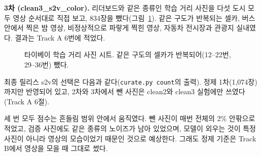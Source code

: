 \documentclass[11pt]{article}
\begin{document}
\textbf{3차 (clean3\_s2v\_color).} 리더보드와 같은 종류인 학습 거리 사진을 다섯 도시 모두 영상 순서대로 직접 보고, 834장을 뺐다(그림~\ref{fig:selfie}). 같은 구도가 반복되는 셀카, 버스 안에서 찍은 밤 영상, 비정상적으로 파랗게 찍힌 영상, 자동차 전시장과 관광지 실내였다. 결과는 Track A 6번에 적었다.

\begin{figure}[H]\centering
{}
\caption{타이베이 학습 거리 사진 시트. 같은 구도의 셀카가 반복되어(12--22번, 29--36번) 뺐다.}
\label{fig:selfie}
\end{figure}

최종 릴리스 s2v의 선택은 다음과 같다(\texttt{curate.py count}의 출력). 정제 1차(1,074장)까지만 반영되어 있고, 2차와 3차에서 뺀 사진은 clean2와 clean3 실험에만 쓰였다(Track A 6절).

세 번 모두 점수는 흔들림 범위 안에서 움직였다. 뺀 사진이 매번 전체의 2\% 안팎으로 적었고, 검증 사진에도 같은 종류의 노이즈가 남아 있었으며, 모델이 외우는 것이 특정 사진이 아니라 영상의 모습이었기 때문인 것으로 예상한다. 그래도 정제 기준은 Track B에서 영상을 모을 때 그대로 썼다.
\end{document}
